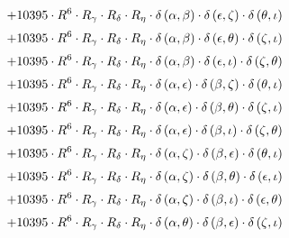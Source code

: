 \begin{subequations}
\begin{gather}
 \\[0.2em] \notag 		 + 10395 \cdot R^{6} \cdot R_{\gamma{}} \cdot R_{\delta{}} \cdot R_{\eta{}} \cdot \delta{}\left(\alpha{}, \beta{}\right) \cdot \delta{}\left(\epsilon{}, \zeta{}\right) \cdot \delta{}\left(\theta{}, \iota{}\right) 
 \\[0.2em] \notag 		 + 10395 \cdot R^{6} \cdot R_{\gamma{}} \cdot R_{\delta{}} \cdot R_{\eta{}} \cdot \delta{}\left(\alpha{}, \beta{}\right) \cdot \delta{}\left(\epsilon{}, \theta{}\right) \cdot \delta{}\left(\zeta{}, \iota{}\right) 
 \\[0.2em] \notag 		 + 10395 \cdot R^{6} \cdot R_{\gamma{}} \cdot R_{\delta{}} \cdot R_{\eta{}} \cdot \delta{}\left(\alpha{}, \beta{}\right) \cdot \delta{}\left(\epsilon{}, \iota{}\right) \cdot \delta{}\left(\zeta{}, \theta{}\right) 
 \\[0.2em] \notag 		 + 10395 \cdot R^{6} \cdot R_{\gamma{}} \cdot R_{\delta{}} \cdot R_{\eta{}} \cdot \delta{}\left(\alpha{}, \epsilon{}\right) \cdot \delta{}\left(\beta{}, \zeta{}\right) \cdot \delta{}\left(\theta{}, \iota{}\right) 
 \\[0.2em] \notag 		 + 10395 \cdot R^{6} \cdot R_{\gamma{}} \cdot R_{\delta{}} \cdot R_{\eta{}} \cdot \delta{}\left(\alpha{}, \epsilon{}\right) \cdot \delta{}\left(\beta{}, \theta{}\right) \cdot \delta{}\left(\zeta{}, \iota{}\right) 
 \\[0.2em] \notag 		 + 10395 \cdot R^{6} \cdot R_{\gamma{}} \cdot R_{\delta{}} \cdot R_{\eta{}} \cdot \delta{}\left(\alpha{}, \epsilon{}\right) \cdot \delta{}\left(\beta{}, \iota{}\right) \cdot \delta{}\left(\zeta{}, \theta{}\right) 
 \\[0.2em] \notag 		 + 10395 \cdot R^{6} \cdot R_{\gamma{}} \cdot R_{\delta{}} \cdot R_{\eta{}} \cdot \delta{}\left(\alpha{}, \zeta{}\right) \cdot \delta{}\left(\beta{}, \epsilon{}\right) \cdot \delta{}\left(\theta{}, \iota{}\right) 
 \\[0.2em] \notag 		 + 10395 \cdot R^{6} \cdot R_{\gamma{}} \cdot R_{\delta{}} \cdot R_{\eta{}} \cdot \delta{}\left(\alpha{}, \zeta{}\right) \cdot \delta{}\left(\beta{}, \theta{}\right) \cdot \delta{}\left(\epsilon{}, \iota{}\right) 
 \\[0.2em] \notag 		 + 10395 \cdot R^{6} \cdot R_{\gamma{}} \cdot R_{\delta{}} \cdot R_{\eta{}} \cdot \delta{}\left(\alpha{}, \zeta{}\right) \cdot \delta{}\left(\beta{}, \iota{}\right) \cdot \delta{}\left(\epsilon{}, \theta{}\right) 
 \\[0.2em] \notag 		 + 10395 \cdot R^{6} \cdot R_{\gamma{}} \cdot R_{\delta{}} \cdot R_{\eta{}} \cdot \delta{}\left(\alpha{}, \theta{}\right) \cdot \delta{}\left(\beta{}, \epsilon{}\right) \cdot \delta{}\left(\zeta{}, \iota{}\right) 

\end{gather}
\end{subequations}
